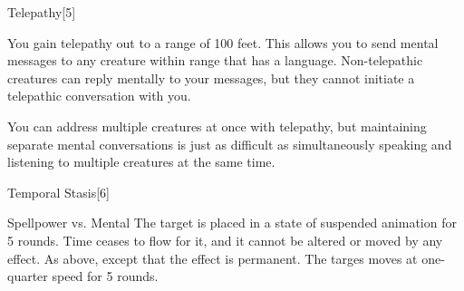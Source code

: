 \begin{spellsection}{Telepathy}[5]
    \begin{spellheader}
    \end{spellheader}
    \begin{spellcontent}
        \begin{spelltargetinginfo}
        \end{spelltargetinginfo}
        \begin{spelleffects}
            \spelleffect You gain telepathy out to a range of 100 feet. This allows you to send mental messages to any creature within range that has a language. Non-telepathic creatures can reply mentally to your messages, but they cannot initiate a telepathic conversation with you.

            You can address multiple creatures at once with telepathy, but maintaining separate mental conversations is just as difficult as simultaneously speaking and listening to multiple creatures at the same time.
            \spelldur \durlong
        \end{spelleffects}
    \end{spellcontent}
    \begin{spellfooter}
        \miscastexplode
    \end{spellfooter}
\end{spellsection}

\begin{spellsection}{Temporal Stasis}[6]
    \begin{spellheader}
    \end{spellheader}
    \begin{spellcontent}
        \begin{spelltargetinginfo}
        \end{spelltargetinginfo}
        \begin{spelleffects}
            \begin{spellattack}{Spellpower vs. Mental}
                \spellsuccess The target is placed in a state of suspended animation for 5 rounds. Time ceases to flow for it, and it cannot be altered or moved by any effect.
                \spellcritical As above, except that the effect is permanent.
                \spellfailure The targes moves at one-quarter speed for 5 rounds.
            \end{spellattack}
        \end{spelleffects}
    \end{spellcontent}
    \begin{spellfooter}
        \miscastrandom
    \end{spellfooter}
\end{spellsection}

